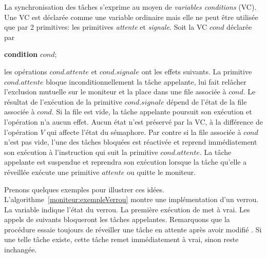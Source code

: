 La synchronisation des tâches s'exprime au moyen de {\em variables conditions} (VC). Une VC est déclarée comme une variable ordinaire mais elle ne peut être utilisée que par 2 primitives: les primitives {\em attente} et {\em signale}. Soit la VC $cond$ déclarée par
\begin{center}
{\bf condition} $cond$;
\end{center}
les opérations $cond.attente$ et $cond.signale$ ont les effets suivants. La primitive $cond.attente$ bloque inconditionnellement la tâche appelante, lui fait relâcher l'exclusion mutuelle sur le moniteur et la place dans une file associée à $cond$. Le résultat de l'exécution de la primitive $cond.signale$ dépend de l'état de la file associée à $cond$. Si la file est vide, la tâche appelante poursuit son exécution et l'opération n'a aucun effet.  Aucun état n'est préservé par la VC, à la différence de l'opération $V$ qui affecte l'état du sémaphore. Par contre si la file associée à $cond$ n'est pas vide, l'une des tâches bloquées est réactivée et reprend immédiatement son exécution à l'instruction qui suit la primitive $cond.attente$. La tâche appelante est suspendue et reprendra son exécution lorsque la tâche qu'elle a réveillée exécute une primitive $attente$ ou quitte le moniteur.

Prenons quelques exemples pour illustrer ces idées. L'algorithme~\ref{moniteur:exempleVerrou} montre une implémentation d'un verrou. La variable  indique l'état du verrou. La première exécution de  met  à vrai. Les appels de  suivants bloqueront les tâches appelantes.  Remarquons que la procédure  essaie toujours de réveiller une tâche en attente après avoir modifié . Si une telle tâche existe, cette tâche remet immédiatement  à vrai, sinon  reste inchangée.

